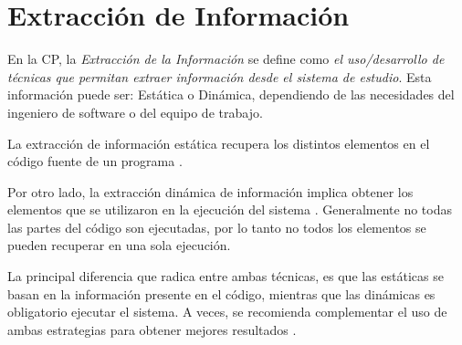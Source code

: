 



\section{Extracción de Información}

En la CP, la \textit{Extracción de la Información} se define como \textit{el uso/desarrollo de técnicas que permitan extraer información desde el sistema de estudio}. 
Esta información puede ser: Estática o Dinámica, dependiendo de las necesidades del 
ingeniero de software o del equipo de trabajo.

La extracción de información estática recupera los distintos elementos en el código fuente de un programa \cite{AHUL06}. 



Por otro lado, la extracción dinámica de información implica obtener los elementos que se utilizaron en la ejecución del sistema \cite{THBE99}. Generalmente no todas las partes del código son ejecutadas, por lo tanto no todos los elementos se pueden recuperar en una sola ejecución.

 
La principal diferencia que radica entre ambas técnicas,  es que las estáticas se basan en la información presente en el código, mientras que las dinámicas es obligatorio ejecutar el sistema.
A veces, se recomienda complementar el uso de ambas estrategias para obtener mejores resultados \cite{TERD01}.

